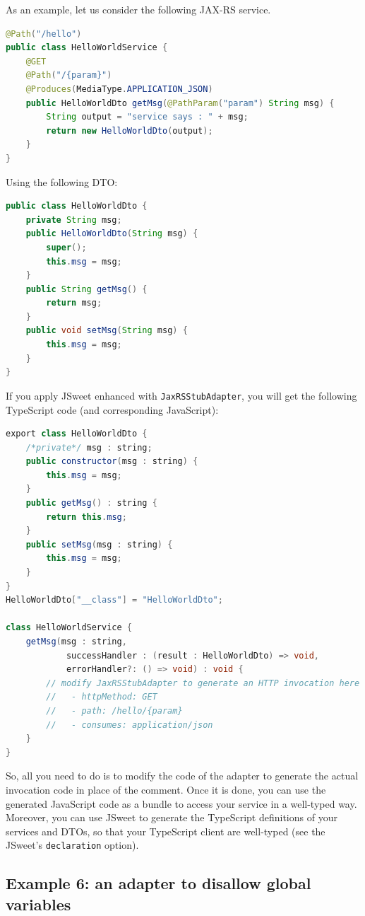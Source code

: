 \documentclass[a4paper]{report}
\begin{document}
As an example, let us consider the following JAX-RS service.

\begin{lstlisting}[language=Java]
@Path("/hello")
public class HelloWorldService {
	@GET
	@Path("/{param}")
	@Produces(MediaType.APPLICATION_JSON)
	public HelloWorldDto getMsg(@PathParam("param") String msg) {
		String output = "service says : " + msg;
		return new HelloWorldDto(output);
	}
}
\end{lstlisting}

\noindent
Using the following DTO:

\begin{lstlisting}[language=Java]
public class HelloWorldDto {
	private String msg;
	public HelloWorldDto(String msg) {
		super();
		this.msg = msg;
	}
	public String getMsg() {
		return msg;
	}
	public void setMsg(String msg) {
		this.msg = msg;
	}
}
\end{lstlisting}

\noindent
If you apply JSweet enhanced with \texttt{JaxRSStubAdapter}, you will get the following TypeScript code (and corresponding JavaScript):

\begin{lstlisting}[language=Java]
export class HelloWorldDto {
	/*private*/ msg : string;
	public constructor(msg : string) {
		this.msg = msg;
	}
	public getMsg() : string {
		return this.msg;
	}
	public setMsg(msg : string) {
		this.msg = msg;
	}
}
HelloWorldDto["__class"] = "HelloWorldDto";

class HelloWorldService {
	getMsg(msg : string, 
			successHandler : (result : HelloWorldDto) => void, 
			errorHandler?: () => void) : void {
		// modify JaxRSStubAdapter to generate an HTTP invocation here
		//   - httpMethod: GET
		//   - path: /hello/{param}
		//   - consumes: application/json
	}
}
\end{lstlisting}

\noindent
So, all you need to do is to modify the code of the adapter to generate the actual invocation code in place of the comment. Once it is done, you can use the generated JavaScript code as a bundle to access your service in a well-typed way. Moreover, you can use JSweet to generate the TypeScript definitions of your services and DTOs, so that your TypeScript client are well-typed (see the JSweet's \texttt{declaration} option).

\subsection{Example 6: an adapter to disallow global variables}
\end{document}
